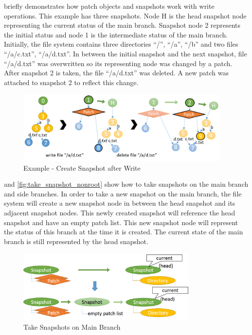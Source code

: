 	 briefly demonstrates how patch objects and snapshots work with write operations. This example has three snapshots. Node H is the head snapshot node representing the current status of the main branch. Snapshot node 2 represents the initial status and node 1 is the intermediate status of the main branch. Initially, the file system contains three directories ``/'', ``/a'', ``/b'' and two files ``/a/c.txt'', ``/a/d.txt''. In between the initial snapshot and the next snapshot, file ``/a/d.txt'' was overwritten so its representing node was changed by a patch. After snapshot 2 is taken, the file ``/a/d.txt'' was deleted. A new patch was attached to snapshot 2 to reflect this change.

\begin{figure}[t]
\centering
\includegraphics[width=0.95\textwidth]{Chapter-4/figs/fig26.png}
\caption{Example - Create Snapshot after Write}
\label{fig:create_snapshots}
\end{figure}

     and \ref{fig:take_snapshot_nonroot} show how to take snapshots on the main branch and side branches. In order to take a new snapshot on the main branch, the file system will create a new snapshot node in between the head snapshot and its adjacent snapshot nodes. This newly created snapshot will reference the head snapshot and have an empty patch list. This new snapshot node will represent the status of this branch at the time it is created. The current state of the main branch is still represented by the head snapshot.

\begin{figure}[t]
\centering
\includegraphics[width=0.8\textwidth]{Chapter-4/figs/fig20.png}
\caption{Take Snapshots on Main Branch}
\label{fig:take_snapshot_root}
\end{figure}
    
